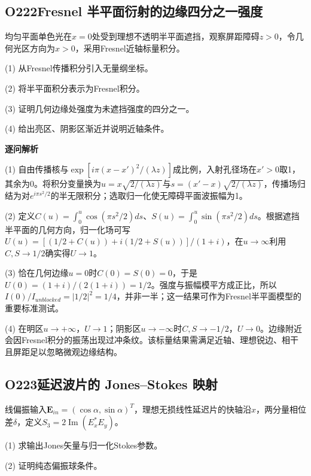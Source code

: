\par\medskip

\subsection*{O222\quad Fresnel 半平面衍射的边缘四分之一强度}

均匀平面单色光在$x=0$处受到理想不透明半平面遮挡，观察屏距障碍$z>0$，令几何光区方向为$x>0$，采用Fresnel近轴标量积分。

(1) 从Fresnel传播积分引入无量纲坐标。

(2) 将半平面积分表示为Fresnel积分。

(3) 证明几何边缘处强度为未遮挡强度的四分之一。

(4) 给出亮区、阴影区渐近并说明近轴条件。

\par\textbf{逐问解析}

(1) 自由传播核与$\exp[i\pi(x-x')^2/(\lambda z)]$成比例，入射孔径场在$x'>0$取1，其余为0。将积分变量换为$u=x\sqrt{2/(\lambda z)}$与$s=(x'-x)\sqrt{2/(\lambda z)}$，传播场归结为对$e^{i\pi s^2/2}$的半无限积分；选取归一化使无障碍平面波振幅为1。

(2) 定义$C(u)=\int_0^u\cos(\pi s^2/2)ds$、$S(u)=\int_0^u\sin(\pi s^2/2)ds$。根据遮挡半平面的几何方向，归一化场可写$U(u)=[(1/2+C(u))+i(1/2+S(u))]/(1+i)$，在$u\to\infty$利用$C,S\to1/2$确实得$U\to1$。

(3) 恰在几何边缘$u=0$时$C(0)=S(0)=0$，于是$U(0)=(1+i)/(2(1+i))=1/2$。强度与振幅模平方成正比，所以$I(0)/I_{unblocked}=|1/2|^2=1/4$，并非一半；这一结果可作为Fresnel半平面模型的重要标准测试。

(4) 在明区$u\to+\infty$，$U\to1$；阴影区$u\to-\infty$时$C,S\to-1/2$，$U\to0$。边缘附近会因Fresnel积分的振荡出现过冲条纹。该标量结果需满足近轴、理想锐边、相干且屏距足以忽略微观边缘结构。

\par\medskip

\subsection*{O223\quad 延迟波片的 Jones–Stokes 映射}

线偏振输入$\mathbf E_{in}=(\cos\alpha,\sin\alpha)^T$，理想无损线性延迟片的快轴沿$x$，两分量相位差$\delta$，定义$S_3=2\operatorname{Im}(E_x^*E_y)$。

(1) 求输出Jones矢量与归一化Stokes参数。

(2) 证明纯态偏振球条件。


